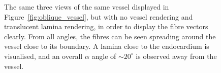     \begin{figure}[htbp]
      \centering
      \vspace{-2.5em}
      \caption{The same three views of the same vessel displayed in Figure~\ref{fig:oblique_vessel}, but with no vessel rendering and translucent lamina rendering, in order to display the fibre vectors clearly. From all angles, the fibres can be seen spreading around the vessel close to its boundary. A lamina close to the endocardium is visualised, and an overall $\alpha$ angle of $\sim20^\circ$ is observed away from the vessel.}
      \label{fig:oblique_no_vessel}
    \end{figure}
  

